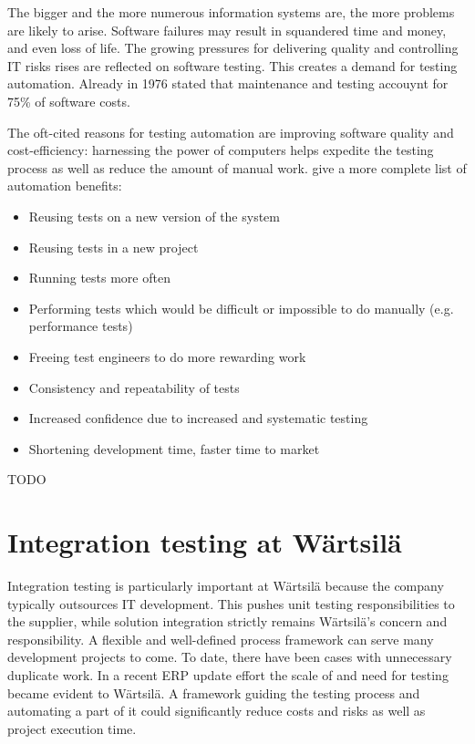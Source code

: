 \documentclass[12pt,a4paper,oneside,pdftex]{report}
\begin{document}
The bigger and the more numerous information systems are, the more problems are likely to arise. Software failures may result in squandered time and money, and even loss of life. The growing pressures for delivering quality and controlling IT risks rises are reflected on software testing. This creates a demand for testing automation. Already in 1976 \citet{myers1976software} stated that maintenance and testing accouynt for 75\% of software costs.

The oft-cited reasons for testing automation are improving software quality and cost-efficiency: harnessing the power of computers helps expedite the testing process as well as reduce the amount of manual work. \citet{fewster1999software} give a more complete list of automation benefits: %

\begin{itemize}
\item Reusing tests on a new version of the system
\item Reusing tests in a new project
\item Running tests more often
\item Performing tests which would be difficult or impossible to do manually (e.g. performance tests)
\item Freeing test engineers to do more rewarding work
\item Consistency and repeatability of tests
\item Increased confidence due to increased and systematic testing
\item Shortening development time, faster time to market
\end{itemize}
TODO

\section{Integration testing at Wärtsilä}

Integration testing is particularly important at Wärtsilä because the company typically outsources IT development. This pushes unit testing responsibilities to the supplier, while solution integration strictly remains Wärtsilä's concern and responsibility. A flexible and well-defined process framework can serve many development projects to come. To date, there have been cases with unnecessary duplicate work. In a recent ERP update effort the scale of and need for testing became evident to Wärtsilä. A framework guiding the testing process and automating a part of it could significantly reduce costs and risks as well as project execution time.
\end{document}
